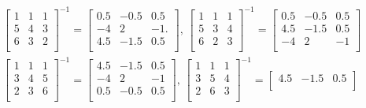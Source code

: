 \begin{enumerate}[\bfseries S1.]
\begin{equation*}
\begin{split}
            \begin{bmatrix}
                1&     1&     1\\
                5&     4&     3\\
                6&     3&     2\\
            \end{bmatrix}^{-1}=\begin{bmatrix}
            0.5 &  -0.5 &   0.5\\
            -4&    2&   -1.\\
            4.5 &  -1.5 &   0.5\\
            \end{bmatrix},\,
            \begin{bmatrix}
                1&     1&     1\\
                5&     3&     4\\
                6&     2&     3\\
            \end{bmatrix}^{-1}=\begin{bmatrix}
                0.5&   -0.5&    0.5\\
                4.5&   -1.5&    0.5\\
                 -4&    2  &    -1\\
            \end{bmatrix}\\
            \begin{bmatrix}
                1&     1&     1\\
                3&     4&     5\\
                2&     3&     6\\
            \end{bmatrix}^{-1}=\begin{bmatrix}
                4.5 &  -1.5&    0.5\\
                -4  &    2 &     -1\\
                 0.5&  -0.5&    0.5\\
            \end{bmatrix},\,
            \begin{bmatrix}
                1&     1&     1\\
                3&     5&     4\\
                2&     6&     3\\
            \end{bmatrix}^{-1}=\begin{bmatrix}
                4.5&   -1.5&    0.5\\

\end{bmatrix}
\end{split}
\end{equation*}
\end{enumerate}
